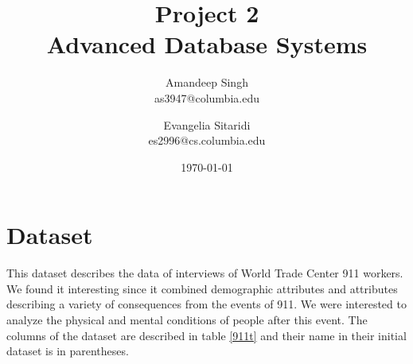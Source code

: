 \documentclass[11pt]{article}
\title{Project 2 \\ Advanced Database Systems \\}
\author{
Amandeep Singh\\as3947@columbia.edu
\and
Evangelia Sitaridi \\ es2996@cs.columbia.edu
}
\date{\today}
\begin{document}
\maketitle


\section{Dataset}
This dataset \cite{911d} describes the data of interviews of World Trade Center 911 workers. We found it interesting since it combined demographic attributes and attributes
describing a variety of consequences from the events of 911. We  were interested to analyze the physical and mental conditions of people after this event. The columns of the dataset are described in table \ref{911t} and their name in their initial dataset is in parentheses.
\end{document}
